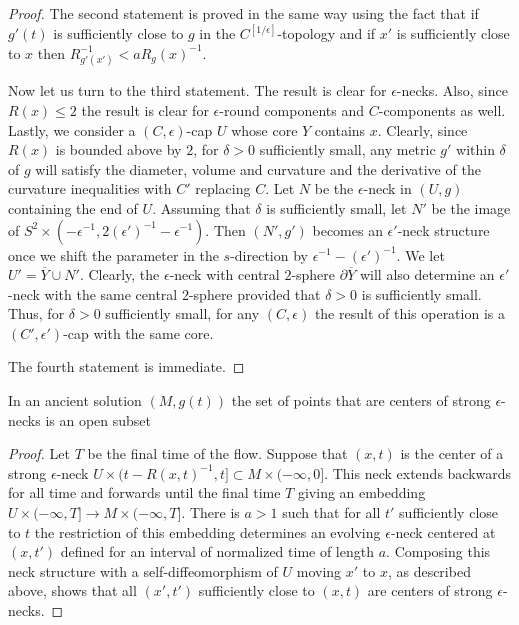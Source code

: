 \begin{proof}
The second statement is proved in the same way using the fact that
if $g'(t)$ is sufficiently close to $g$ in the
$C^{[1/\epsilon]}$-topology and if $x'$ is sufficiently close to $x$
then $R_{g'(x')}^{-1}<aR_g(x)^{-1}$.


Now let us turn to the third statement. The result is clear for
$\epsilon$-necks. Also, since $R(x)\le 2$ the result is clear for
$\epsilon$-round components and $C$-components as well. Lastly, we
consider a $(C,\epsilon)$-cap $U$ whose core $Y$ contains $x$.
 Clearly,
since $R(x)$ is bounded above by  $2$, for $\delta>0$ sufficiently
small, any metric $g'$ within $\delta$ of $g$ will satisfy the
diameter, volume and curvature and the derivative of the curvature
inequalities with $C'$ replacing $C$. Let $N$ be the $\epsilon$-neck
in $(U,g)$ containing the end of $U$. Assuming that $\delta$ is
sufficiently small, let $N'$ be the image of $S^2\times
\left(-\epsilon^{-1},2(\epsilon')^{-1}-\epsilon^{-1}\right)$. Then
$(N',g')$ becomes an $\epsilon'$-neck structure once we shift the
parameter in the $s$-direction by $\epsilon^{-1}-(\epsilon')^{-1}$.
We let $U'=\overline Y\cup N'$. Clearly, the $\epsilon$-neck with
central $2$-sphere $\partial \overline Y$ will also determine an
$\epsilon'$-neck with the same central $2$-sphere provided that
$\delta>0$ is sufficiently small. Thus, for $\delta>0$ sufficiently
small, for any $(C,\epsilon)$ the result of this operation is a
$(C',\epsilon')$-cap with the same core.


The fourth statement is immediate.
\end{proof}

\begin{corollary}\label{cor:strong-neck-centers-open}
\label{strepsopen}
In an ancient solution $(M,g(t))$ the set of points that are centers
of strong $\epsilon$-necks is an open subset
\end{corollary}

\begin{proof}
Let $T$ be the final time of the flow. Suppose that $(x,t)$ is the
center of a strong $\epsilon$-neck $U\times (t-R(x,t)^{-1},t]\subset
M\times (-\infty,0]$. This neck extends backwards for all time and
forwards until the final time $T$ giving an embedding $U\times
(-\infty,T]\to M\times (-\infty,T]$. There is $a>1$ such that for
all $t'$ sufficiently close to $t$ the restriction of this embedding
determines an evolving $\epsilon$-neck centered at $(x,t')$ defined
for an interval of normalized time of length  $a$. Composing this
neck structure with a self-diffeomorphism of $U$ moving $x'$ to $x$,
as described above, shows that all $(x',t')$ sufficiently close to
$(x,t)$ are centers of strong $\epsilon$-necks.
\end{proof}


